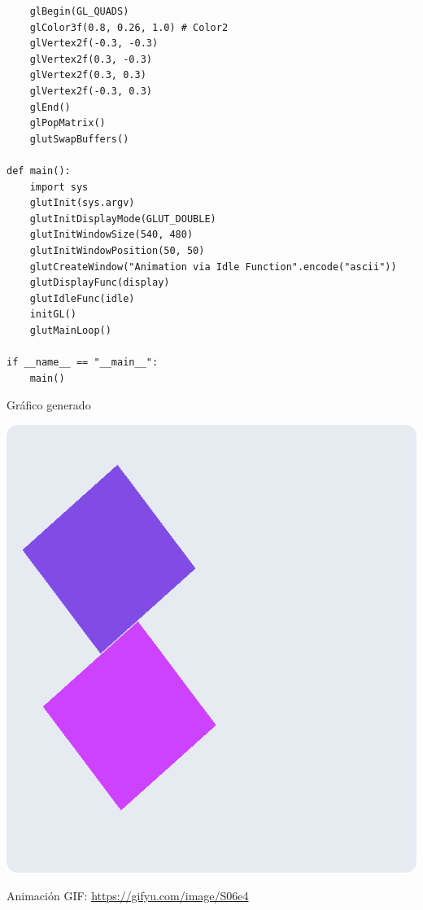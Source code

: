\documentclass[a4paper]{article}
\begin{document}
\begin{center}
\begin{mycodeboxl}
\begin{lstlisting}
    glBegin(GL_QUADS)
    glColor3f(0.8, 0.26, 1.0) # Color2
    glVertex2f(-0.3, -0.3)
    glVertex2f(0.3, -0.3)
    glVertex2f(0.3, 0.3)
    glVertex2f(-0.3, 0.3)
    glEnd()
    glPopMatrix() 
    glutSwapBuffers()

def main():
    import sys
    glutInit(sys.argv)  
    glutInitDisplayMode(GLUT_DOUBLE) 
    glutInitWindowSize(540, 480)
    glutInitWindowPosition(50, 50)
    glutCreateWindow("Animation via Idle Function".encode("ascii"))
    glutDisplayFunc(display)
    glutIdleFunc(idle)  
    initGL() 
    glutMainLoop() 

if __name__ == "__main__":
    main()
\end{lstlisting}
\end{mycodeboxl}
\end{center}
\newpage
Gráfico generado 
\begin{center}
\includegraphics[width=16cm]{./src/animacion.png}
\end{center}
Animación GIF:
\url{https://gifyu.com/image/S06e4}
\newpage
\end{document}
